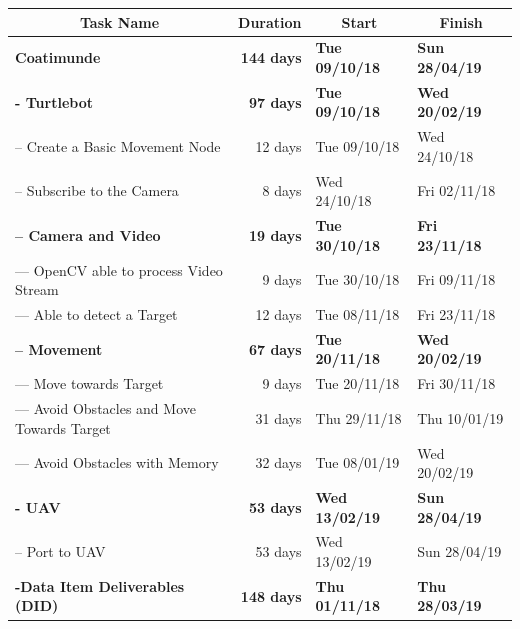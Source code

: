 \documentclass{article}
\begin{document}
\begin{table}[]
	\begin{tabular}{|l|r|l|l|}
		\hline
		\multicolumn{1}{|c|}{\textbf{Task Name}}            & \multicolumn{1}{c|}{\textbf{Duration}} & \multicolumn{1}{c|}{\textbf{Start}} & \multicolumn{1}{c|}{\textbf{Finish}} \\ \hline
		\textbf{Coatimunde}              		    & \textbf{144 days} & \textbf{Tue 09/10/18} & \textbf{Sun 28/04/19} \\ \hline
		\textbf{- Turtlebot}                                & \textbf{97 days}  & \textbf{Tue 09/10/18} & \textbf{Wed 20/02/19} \\ \hline
		-- Create a Basic Movement Node                     & 12 days           & Tue 09/10/18          & Wed 24/10/18          \\ \hline
		-- Subscribe to the Camera                          & 8 days            & Wed 24/10/18          & Fri 02/11/18          \\ \hline
		\textbf{-- Camera and Video}                        & \textbf{19 days}  & \textbf{Tue 30/10/18} & \textbf{Fri 23/11/18} \\ \hline
		--- OpenCV able to process Video Stream 	    & 9 days            & Tue 30/10/18          & Fri 09/11/18          \\ \hline
		--- Able to detect a Target                         & 12 days           & Tue 08/11/18          & Fri 23/11/18          \\ \hline
		\textbf{-- Movement}                                & \textbf{67 days}  & \textbf{Tue 20/11/18} & \textbf{Wed 20/02/19} \\ \hline
		--- Move towards Target                             & 9 days            & Tue 20/11/18          & Fri 30/11/18          \\ \hline
		--- Avoid Obstacles and Move Towards Target         & 31 days           & Thu 29/11/18          & Thu 10/01/19          \\ \hline
		--- Avoid Obstacles with Memory 		    & 32 days           & Tue 08/01/19          & Wed 20/02/19          \\ \hline
		\textbf{- UAV}                                      & \textbf{53 days}  & \textbf{Wed 13/02/19} & \textbf{Sun 28/04/19} \\ \hline
		-- Port to UAV                                      & 53 days           & Wed 13/02/19          & Sun 28/04/19          \\ \hline
		\textbf{-Data Item Deliverables (DID)}		    & \textbf{148 days} & \textbf{Thu 01/11/18} & \textbf{Thu 28/03/19} \\ \hline

\end{tabular}
\end{table}
\end{document}
